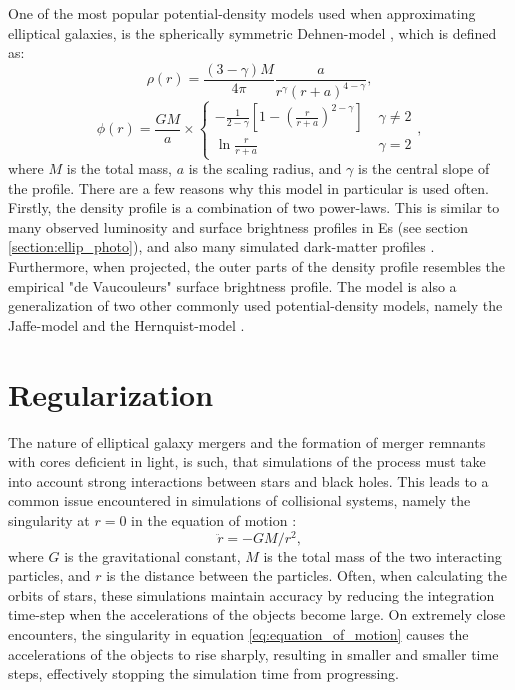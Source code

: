 \documentclass[english, oneside]{HYgradu}
\begin{document}
One of the most popular potential-density models used when approximating elliptical galaxies, is the spherically symmetric Dehnen-model \citep{Dehnen1993}, which is defined as:
\begin{equation}
\rho(r) = \frac{(3-\gamma)M}{4\pi} \frac{a}{r^\gamma (r+a)^{4-\gamma}}, \label{eq:dehnen_density}
\end{equation}
\begin{equation}
\phi(r) = \frac{GM}{a} \times 
\begin{cases}
	-\frac{1}{2-\gamma} \left[ 1 - \left( \frac{r}{r+a} \right)^{2-\gamma} \right] & \; \gamma \neq 2 \\
	\ln \frac{r}{r+a}	 & \; \gamma = 2
\end{cases},
\label{eq:dehnen_potential}
\end{equation}
where $M$ is the total mass, $a$ is the scaling radius, and $\gamma$ is the central slope of the profile. There are a few reasons why this model in particular is used often. Firstly, the density profile is a combination of two power-laws. This is similar to many observed luminosity and surface brightness profiles in Es (see section \ref{section:ellip_photo}), and also many simulated dark-matter profiles \citep{BinneyTremaine}. Furthermore, when projected, the outer parts of the density profile resembles the empirical "de Vaucouleurs" surface brightness profile. The model is also a generalization of two other commonly used potential-density models, namely the Jaffe-model and the Hernquist-model \citep[for these models $\gamma = 2$ and $\gamma = 1$ respectively][]{Jaffe1983, Hernquist1990}. 

\section{Regularization}

The nature of elliptical galaxy mergers and the formation of merger remnants with cores deficient in light, is such, that simulations of the process must take into account strong interactions between stars and black holes. This leads to a common issue encountered in simulations of collisional systems, namely the singularity at $r=0$ in the equation of motion \citep{BinneyTremaine}:
\begin{equation}
\ddot{r} = -GM/r^2, \label{eq:equation_of_motion}
\end{equation}
where $G$ is the gravitational constant, $M$ is the total mass of the two interacting particles, and $r$ is the distance between the particles. Often, when calculating the orbits of stars, these simulations maintain accuracy by reducing the integration time-step when the accelerations of the objects become large. On extremely close encounters, the singularity in equation \ref{eq:equation_of_motion} causes the accelerations of the objects to rise sharply, resulting in smaller and smaller time steps, effectively stopping the simulation time from progressing. 
\end{document}
